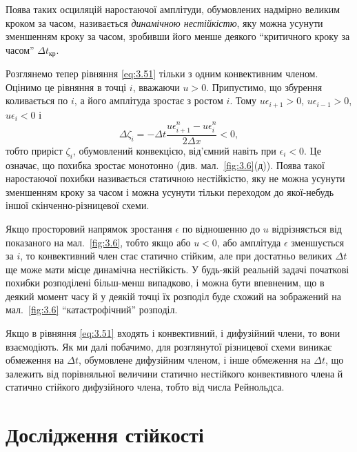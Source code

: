 \begin{definition}
    Поява таких осциляцій наростаючої амплітуди, обумовлених надмірно великим кроком за часом, називається \textit{динамічною нестійкістю}, яку можна усунути зменшенням кроку за часом, зробивши його менше деякого ``критичного кроку за часом'' $\Delta t_{\text{кр}}$.
\end{definition}

Розглянемо тепер рівняння \eqref{eq:3.51} тільки з одним конвективним членом. Оцінимо це рівняння в точці $i$, вважаючи $u > 0$. Припустимо, що збурення коливається по $i$, а його амплітуда зростає з ростом $i$. Тому $u \epsilon_{i + 1} > 0$, $u \epsilon_{i - 1} > 0$, $u \epsilon_i < 0$ і 
\begin{equation}
    \label{eq:3.56}
    \Delta \zeta_i = - \Delta t \frac{u \epsilon_{i + 1}^n - u \epsilon_i^n}{2 \Delta x} < 0,
\end{equation}
тобто приріст $\zeta_i$, обумовлений конвекцією, від'ємний навіть при $\epsilon_i < 0$. Це означає, що похибка зростає монотонно (див. мал.~\ref{fig:3.6}(д)). Поява такої наростаючої похибки називається статичною нестійкістю, яку не можна усунути зменшенням кроку за часом і можна усунути тільки переходом до якої-небудь іншої скінченно-різницевої схеми. \medskip

Якщо просторовий напрямок зростання $\epsilon$ по відношенню до $u$ відрізняється від показаного на мал.~\ref{fig:3.6}, тобто якщо або $u < 0$, або амплітуда $\epsilon$ зменшується за $i$, то конвективний член стає статично стійким, але при достатньо великих $\Delta t$ ще може мати місце динамічна нестійкість. У будь-якій реальній задачі початкові похибки розподілені більш-менш випадково, і можна бути впевненим, що в деякий момент часу й у деякій точці їх розподіл буде схожий на зображений на мал.~\ref{fig:3.6} ``катастрофічний'' розподіл. \medskip

Якщо в рівняння \eqref{eq:3.51} входять і конвективний, і дифузійний члени, то вони взаємодіють. Як ми далі побачимо, для розглянутої різницевої схеми виникає обмеження на $\Delta t$, обумовлене дифузійним членом, і інше обмеження на $\Delta t$, що залежить від порівняльної величини статично нестійкого конвективного члена й статично стійкого дифузійного члена, тобто від числа Рейнольдса. 

\section{Дослідження стійкості}

